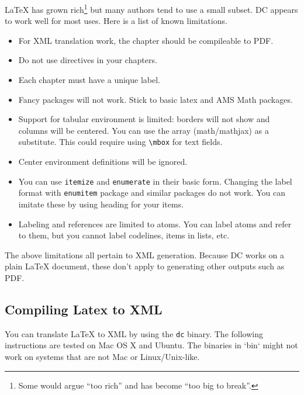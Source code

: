 LaTeX has grown rich\footnote{Some would argue ``too rich'' and has become ``too big to break''.} but many authors tend to use a small subset.  
%
DC appears to work well for most uses. 
%
Here is a list of known limitations.  
\begin{itemize}

\item For XML translation work, the chapter should be compileable to PDF.

\item Do not use \lstinline`` directives in your chapters.

\item Each chapter must have a unique label.

\item Fancy packages will not work.  Stick to basic latex and AMS Math packages.

\item Support for tabular environment is limited: borders will not show and columns will be centered.  You can use the array (math/mathjax) as a substitute.  This could require using \lstinline`\mbox` for text fields.  
 
\item Center environment definitions will be ignored.

\item You can use \lstinline`itemize` and \lstinline`enumerate` in their basic form.  Changing the label format with \lstinline`enumitem` package and similar packages do not work.  You can imitate these by using heading for your items.  

\item Labeling and references are limited to atoms.  You can label atoms and refer to them, but you cannot label codelines, items in lists, etc.

\end{itemize}

\begin{remark}
The above limitations all pertain to XML generation.  Because DC works on a plain LaTeX document, these don't apply to generating other outputs such as 
PDF.
\end{remark}  

\subsection{Compiling Latex to XML}

You can translate LaTeX to XML by using the \lstinline`dc` binary.
%
The following instructions are tested on Mac OS X and Ubuntu.  The binaries in `bin` might not work on systems that are not Mac or Linux/Unix-like. 


